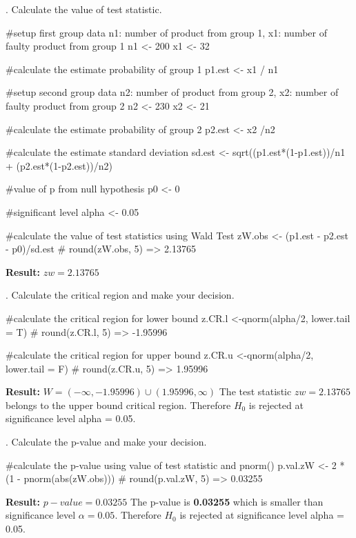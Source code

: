 \documentclass[12pt, oneside]{report}\usepackage[]{graphicx}\usepackage[]{color}
\begin{document}
. Calculate the value of test statistic.
\begin{Schunk}
\begin{Sinput}
#setup first group data n1: number of product from group 1, x1: number of faulty product from group 1
n1 <- 200
x1 <- 32

#calculate the estimate probability of group 1
p1.est <- x1 / n1

#setup second group data n2: number of product from group 2, x2: number of faulty product from group 2
n2 <- 230
x2 <- 21

#calculate the estimate probability of group 2
p2.est <- x2 /n2

#calculate the estimate standard deviation
sd.est <- sqrt((p1.est*(1-p1.est))/n1 + (p2.est*(1-p2.est))/n2)

#value of p from null hypothesis
p0 <- 0

#significant level
alpha <- 0.05

#calculate the value of test statistics using Wald Test
zW.obs <- (p1.est - p2.est - p0)/sd.est
# round(zW.obs, 5) => 2.13765
\end{Sinput}
\end{Schunk}
{\bf Result:} $zw = 2.13765 $ \newline

. Calculate the critical region and make your decision.
\begin{Schunk}
\begin{Sinput}
#calculate the critical region for lower bound
z.CR.l <-qnorm(alpha/2, lower.tail = T)
# round(z.CR.l, 5) => -1.95996

#calculate the critical region for upper bound
z.CR.u <-qnorm(alpha/2, lower.tail = F)
# round(z.CR.u, 5) => 1.95996
\end{Sinput}
\end{Schunk}
{\bf Result:} $W = (-\infty, -1.95996) \cup (1.95996, \infty) $ \newline
The test statistic $zw = 2.13765$ belongs to the upper bound critical region. Therefore $H_0$ is rejected at significance level alpha = 0.05. \newline

. Calculate the p-value and make your decision.
\begin{Schunk}
\begin{Sinput}
#calculate the p-value using value of test statistic and pnorm()
p.val.zW <- 2 * (1 - pnorm(abs(zW.obs)))
# round(p.val.zW, 5) => 0.03255
\end{Sinput}
\end{Schunk}
{\bf Result:} $p-value = 0.03255$ \newline
The p-value is {\bf 0.03255} which is smaller than significance level $\alpha = 0.05$. Therefore $H_0$ is rejected at significance level alpha = 0.05. \newline
\end{document}
